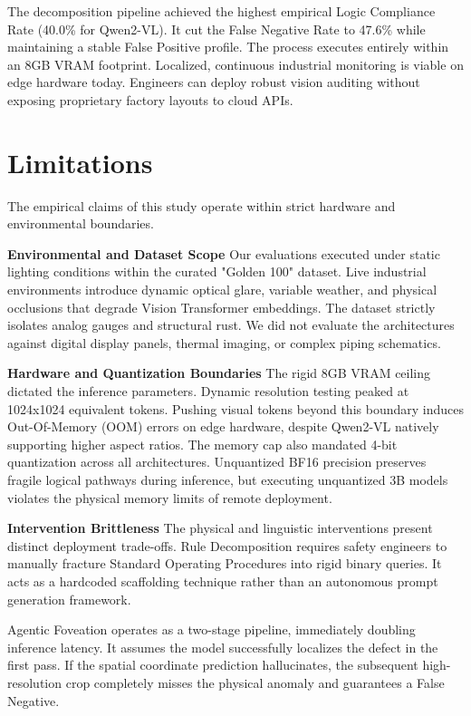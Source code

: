 \documentclass{article}
\begin{document}
The decomposition pipeline achieved the highest empirical Logic Compliance Rate (40.0\% for Qwen2-VL). It cut the False Negative Rate to 47.6\% while maintaining a stable False Positive profile. The process executes entirely within an 8GB VRAM footprint. Localized, continuous industrial monitoring is viable on edge hardware today. Engineers can deploy robust vision auditing without exposing proprietary factory layouts to cloud APIs.

\section*{Limitations}


The empirical claims of this study operate within strict hardware and environmental boundaries. 

\textbf{Environmental and Dataset Scope}
Our evaluations executed under static lighting conditions within the curated "Golden 100" dataset. Live industrial environments introduce dynamic optical glare, variable weather, and physical occlusions that degrade Vision Transformer embeddings. The dataset strictly isolates analog gauges and structural rust. We did not evaluate the architectures against digital display panels, thermal imaging, or complex piping schematics.

\textbf{Hardware and Quantization Boundaries}
The rigid 8GB VRAM ceiling dictated the inference parameters. Dynamic resolution testing peaked at 1024x1024 equivalent tokens. Pushing visual tokens beyond this boundary induces Out-Of-Memory (OOM) errors on edge hardware, despite Qwen2-VL natively supporting higher aspect ratios. The memory cap also mandated 4-bit quantization across all architectures. Unquantized BF16 precision preserves fragile logical pathways during inference, but executing unquantized 3B models violates the physical memory limits of remote deployment.

\textbf{Intervention Brittleness}
The physical and linguistic interventions present distinct deployment trade-offs. Rule Decomposition requires safety engineers to manually fracture Standard Operating Procedures into rigid binary queries. It acts as a hardcoded scaffolding technique rather than an autonomous prompt generation framework.

Agentic Foveation operates as a two-stage pipeline, immediately doubling inference latency. It assumes the model successfully localizes the defect in the first pass. If the spatial coordinate prediction hallucinates, the subsequent high-resolution crop completely misses the physical anomaly and guarantees a False Negative.
\end{document}
